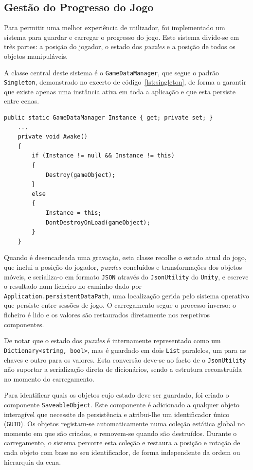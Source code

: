 \documentclass[a4paper, 12pt]{book}
\begin{document}
\subsection{Gestão do Progresso do Jogo}
\label{ssec:gestao-progresso}
Para permitir uma melhor experiência de utilizador, foi implementado
um sistema para guardar e carregar o progresso do jogo. Este sistema
divide-se em três partes: a posição do jogador, o estado dos \textit{puzzles}
e a posição de todos os objetos manipuláveis.
\par
A classe central deste sistema é o \texttt{GameDataManager}, que segue
o padrão \texttt{Singleton}, demonstrado no excerto de código~\ref{lst:singleton}, 
de forma a garantir que existe
apenas uma instância ativa em toda a aplicação e que esta persiste
entre cenas. 

\begin{lstlisting}[style=csharp, 
    caption={\texttt{GameDataManager} - Singleton implementado em \texttt{C\#}.}, label={lst:singleton},
    captionpos=t]
    public static GameDataManager Instance { get; private set; }
    ...
    private void Awake()
    {
        if (Instance != null && Instance != this)
        {
            Destroy(gameObject);
        }
        else
        {
            Instance = this;
            DontDestroyOnLoad(gameObject);
        }
    }
\end{lstlisting}

Quando é desencadeada uma gravação, esta classe recolhe
o estado atual do jogo, que inclui a posição do jogador, \textit{puzzles} concluídos e
transformações dos objetos móveis, e serializa-o em formato \texttt{JSON}
através do \texttt{JsonUtility} do \texttt{Unity}, e escreve o resultado num
ficheiro no caminho dado por \texttt{Application.persistentDataPath},
uma localização gerida pelo sistema operativo que persiste entre
sessões de jogo. O carregamento segue o processo inverso: o ficheiro
é lido e os valores são restaurados diretamente nos respetivos
componentes.
\par
De notar que o estado dos \textit{puzzles} é internamente representado como um
\texttt{Dictionary<string, bool>}, mas é guardado em dois \texttt{List}
paralelos, um para as chaves e outro para os valores. Esta
conversão deve-se ao facto de o \texttt{JsonUtility} não suportar a
serialização direta de dicionários, sendo a estrutura reconstruída
no momento do carregamento.

Para identificar quais os objetos cujo estado deve ser guardado, foi
criado o componente \texttt{SaveableObject}. Este componente é
adicionado a qualquer objeto interagível que necessite de persistência
e atribui-lhe um identificador único (\texttt{GUID}). Os objetos registam-se
automaticamente numa coleção estática global no momento em que são
criados, e removem-se quando são destruídos. Durante o carregamento,
o sistema percorre esta coleção e restaura a posição e rotação de
cada objeto com base no seu identificador, de forma independente
da ordem ou hierarquia da cena.
\end{document}
